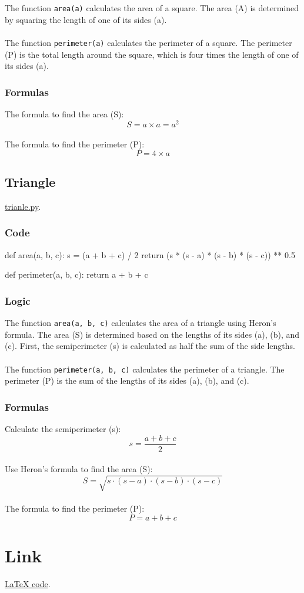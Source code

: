 \documentclass[12pt]{article}
\begin{document}
The function \texttt{area(a)} calculates the area of a square. The area (A) is determined by squaring the length of one of its sides (a). \\
\\
The function \texttt{perimeter(a)} calculates the perimeter of a square. The perimeter (P) is the total length around the square, which is four times the length of one of its sides (a). 

\subsubsection{Formulas}

The formula to find the area (S):
\[S = a \times a = a^2\] \\
The formula to find the perimeter (P):
\[P = 4 \times a\]

\newpage

\subsection{Triangle}
\href{https://github.com/niumandzi/geometric_lib/blob/docs/triangle.py}{trianle.py}.
\subsubsection{Code}
\begin{python}
def area(a, b, c):
    s = (a + b + c) / 2
    return (s * (s - a) * (s - b) * (s - c)) ** 0.5

def perimeter(a, b, c):
    return a + b + c
\end{python}

\subsubsection{Logic}

The function \texttt{area(a, b, c)} calculates the area of a triangle using Heron's formula. The area (S) is determined based on the lengths of its sides (a), (b), and (c). First, the semiperimeter (s) is calculated as half the sum of the side lengths. \\
\\
The function \texttt{perimeter(a, b, c)} calculates the perimeter of a triangle. The perimeter (P) is the sum of the lengths of its sides (a), (b), and (c). 
\subsubsection{Formulas}

Calculate the semiperimeter (s):
\[s = \frac{a + b + c}{2}\] \\
Use Heron's formula to find the area (S):
\[S = \sqrt{s \cdot (s - a) \cdot (s - b) \cdot (s - c)}\] \\
The formula to find the perimeter (P):
\[P = a + b + c\]

\section{Link}
\href{https://github.com/niumandzi/geometric_lib/blob/latex/docs/documentation.tex}{LaTeX code}.
\end{document}
